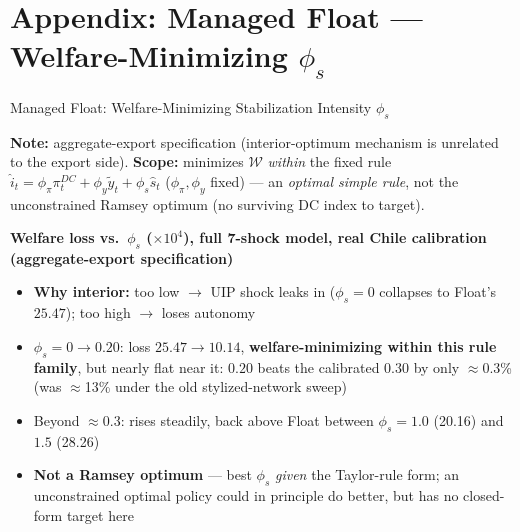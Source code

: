\section*{Appendix: Managed Float --- Welfare-Minimizing $\phi_s$}
\begin{frame}{Managed Float: Welfare-Minimizing Stabilization Intensity $\phi_s$}

{\tiny \textbf{Note:} aggregate-export specification (interior-optimum mechanism is unrelated to the export side). \textbf{Scope:} minimizes $\mathcal W$ \emph{within} the fixed rule $\hat i_t=\phi_\pi\pi_t^{DC}+\phi_y\tilde y_t+\phi_s\hat s_t$ ($\phi_\pi,\phi_y$ fixed) --- an \emph{optimal simple rule}, not the unconstrained Ramsey optimum (no surviving DC index to target).}

\vspace{-6pt}
\begin{center}
{\tiny \textbf{Welfare loss vs.\ $\phi_s$ ($\times10^4$), full 7-shock model, real Chile calibration (aggregate-export specification)}}\\[1pt]
\end{center}

\vspace{-4pt}
{\scriptsize
\begin{itemize}\setlength{\itemsep}{1pt}\setlength{\topsep}{0pt}
\item \textbf{Why interior:} too low $\to$ UIP shock leaks in ($\phi_s{=}0$ collapses to Float's $25.47$); too high $\to$ loses autonomy
\item $\phi_s{=}0\to0.20$: loss $25.47\to10.14$, \textbf{welfare-minimizing within this rule family}, but nearly flat near it: $0.20$ beats the calibrated $0.30$ by only $\approx$0.3\% (was $\approx$13\% under the old stylized-network sweep)
\item Beyond $\approx0.3$: rises steadily, back above Float between $\phi_s{=}1.0$ (20.16) and $1.5$ (28.26)
\item \textbf{Not a Ramsey optimum} --- best $\phi_s$ \emph{given} the Taylor-rule form; an unconstrained optimal policy could in principle do better, but has no closed-form target here
\end{itemize}}

\end{frame}

